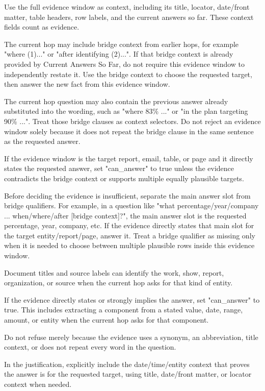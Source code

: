 \begin{tcolorbox}
\begin{scriptsize}
Use the full evidence window as context, including its title, locator, date/front matter, table headers, row labels, and the current answers so far. These context fields count as evidence.\par
The current hop may include bridge context from earlier hops, for example "where (1)..." or "after identifying (2)...". If that bridge context is already provided by Current Answers So Far, do not require this evidence window to independently restate it. Use the bridge context to choose the requested target, then answer the new fact from this evidence window.\par
The current hop question may also contain the previous answer already substituted into the wording, such as "where 83\% ..." or "in the plan targeting 90\% ...". Treat those bridge clauses as context selectors. Do not reject an evidence window solely because it does not repeat the bridge clause in the same sentence as the requested answer.\par
If the evidence window is the target report, email, table, or page and it directly states the requested answer, set "can\_answer" to true unless the evidence contradicts the bridge context or supports multiple equally plausible targets.\par
Before deciding the evidence is insufficient, separate the main answer slot from bridge qualifiers. For example, in a question like "what percentage/year/company ... when/where/after [bridge context]?", the main answer slot is the requested percentage, year, company, etc. If the evidence directly states that main slot for the target entity/report/page, answer it. Treat a bridge qualifier as missing only when it is needed to choose between multiple plausible rows inside this evidence window.\par
Document titles and source labels can identify the work, show, report, organization, or source when the current hop asks for that kind of entity.\par
If the evidence directly states or strongly implies the answer, set "can\_answer" to true. This includes extracting a component from a stated value, date, range, amount, or entity when the current hop asks for that component.\par
Do not refuse merely because the evidence uses a synonym, an abbreviation, title context, or does not repeat every word in the question.\par
In the justification, explicitly include the date/time/entity context that proves the answer is for the requested target, using title, date/front matter, or locator context when needed.\par

\end{scriptsize}
\end{tcolorbox}
